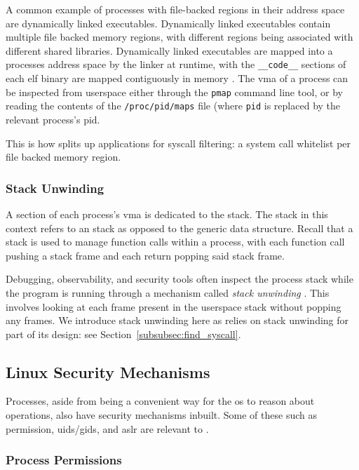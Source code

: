 A common example of processes with file-backed regions in their address space
are dynamically linked executables. Dynamically linked executables contain
multiple file backed memory regions, with different regions being associated
with different shared libraries. Dynamically linked executables are mapped
into a processes address space by the linker at runtime, with the
\texttt{\_\_code\_\_} sections of each \ac{elf} binary are mapped contiguously 
in memory \cite{DYNAMIC_LINKERS_OS}. The \ac{vma} of a process can be
inspected from userspace either through the \texttt{pmap} command line tool, or
by reading the contents of the \texttt{/proc/pid/maps} file (where \texttt{pid}
is replaced by the relevant process's \ac{pid}.

This is how \af splits up applications for syscall filtering: a system call
whitelist per file backed memory region.

\subsubsection{Stack Unwinding}

A section of each process's \ac{vma} is dedicated to the stack. The stack in
this context refers to an  stack as opposed to the generic data
structure. Recall that a stack is used to manage function calls within a
process, with each function call pushing a stack frame and each return popping
said stack frame.
 
Debugging, observability, and security tools often inspect the process stack
while the program is running through a mechanism called \textit{stack
unwinding} \cite{gregg2014linux, kilroy2022linker}. This involves looking at 
each frame present in the userspace stack without popping any frames. We
introduce stack unwinding here as \af relies on stack unwinding for part of
its design: see Section~\ref{subsubsec:find_syscall}.

\subsection{Linux Security Mechanisms}

Processes, aside from being a convenient way for the \ac{os} to reason about
operations, also have security mechanisms inbuilt. Some of these such as
permission, \acp{uid}/\acp{gid}, and \ac{aslr} are relevant to \af.

\subsubsection{Process Permissions}

